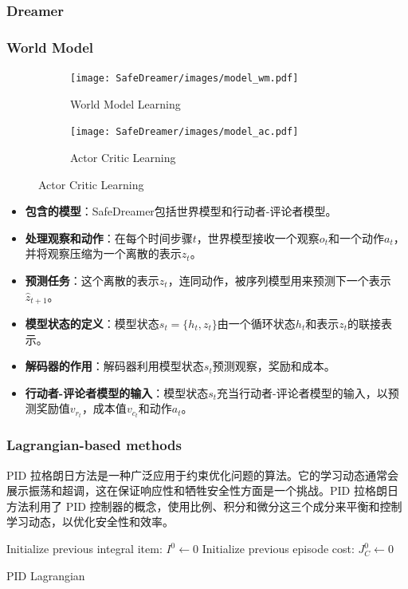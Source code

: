 \documentclass[10pt,mathserif]{beamer}%
\begin{document}
\subsubsection{Dreamer}
\begin{frame}[t, fragile]
  \frametitle{World Model}
   \begin{figure}
\begin{subfigure}{.5\textwidth}
\texttt{[image: SafeDreamer/images/model\_wm.pdf]}
\caption{World Model Learning}
\end{subfigure}
\begin{subfigure}{.43\textwidth}
\texttt{[image: SafeDreamer/images/model\_ac.pdf]}
\caption{Actor Critic Learning}
\end{subfigure}
\label{fig:model}
\end{figure}
{
\fontsize{8pt}{9.6pt}\selectfont
\begin{itemize}
\item \textbf{包含的模型}：SafeDreamer包括世界模型和行动者-评论者模型。
\item \textbf{处理观察和动作}：在每个时间步骤$t$，世界模型接收一个观察$o_t$和一个动作$a_t$，并将观察压缩为一个离散的表示$z_t$。
\item \textbf{预测任务}：这个离散的表示$z_t$，连同动作，被序列模型用来预测下一个表示$\hat{z}_{t+1}$。
\item \textbf{模型状态的定义}：模型状态$s_t=\{h_t, z_t\}$由一个循环状态$h_t$和表示$z_t$的联接表示。
\item \textbf{解码器的作用}：解码器利用模型状态$s_t$预测观察，奖励和成本。
\item \textbf{行动者-评论者模型的输入}：模型状态$s_t$充当行动者-评论者模型的输入，以预测奖励值$v_{r_t}$，成本值$v_{c_t}$和动作$a_t$。
\end{itemize}
}
\end{frame}

\begin{frame}[fragile]
	\frametitle{Lagrangian-based methods}
	PID 拉格朗日方法是一种广泛应用于约束优化问题的算法。它的学习动态通常会展示振荡和超调，这在保证响应性和牺牲安全性方面是一个挑战。PID 拉格朗日方法利用了 PID 控制器的概念，使用比例、积分和微分这三个成分来平衡和控制学习动态，以优化安全性和效率。
	\begin{algorithm}[H]
		\SetAlgoLined
		
		Initialize previous integral item: $I^0 \leftarrow 0$\;
		Initialize previous episode cost: $J_C^0 \leftarrow 0$\;
		\caption{PID Lagrangian}
		\label{alg: pid_lag}
		\end{algorithm}
\end{frame}
\end{document}
